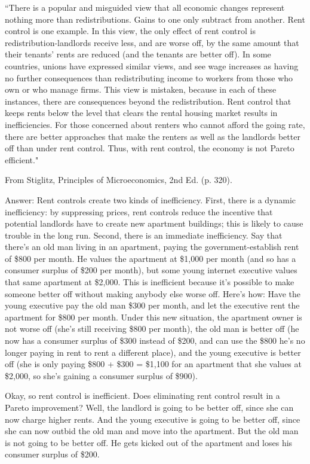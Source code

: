 ``There is a popular and misguided view that all economic changes represent nothing more than redistributions. Gains to one only subtract from another. Rent control is one example. In this view, the only effect of rent control is redistribution-landlords receive less, and are worse off, by the same amount that their tenants' rents are reduced (and the tenants are better off). In some countries, unions have expressed similar views, and see wage increases as having no further consequences than redistributing income to workers from those who own or who manage firms. This view is mistaken, because in each of these instances, there are consequences beyond the redistribution. Rent control that keeps rents below the level that clears the rental housing market results in inefficiencies. For those concerned about renters who cannot afford the going rate, there are better approaches that make the renters as well as the landlords better off than under rent control. Thus, with rent control, the economy is not Pareto efficient."

From Stiglitz, Principles of Microeconomics, 2nd Ed. (p. 320).


Answer: Rent controls create two kinds of inefficiency. First, there is a dynamic inefficiency: by suppressing prices, rent controls reduce the incentive that potential landlords have to create new apartment buildings; this is likely to cause trouble in the long run. Second, there is an immediate inefficiency. Say that there's an old man living in an apartment, paying the government-establish rent of \$800 per month. He values the apartment at \$1,000 per month (and so has a consumer surplus of \$200 per month), but some young internet executive values that same apartment at \$2,000. This is inefficient because it's possible to make someone better off without making anybody else worse off. Here's how: Have the young executive pay the old man \$300 per month, and let the executive rent the apartment for \$800 per month. Under this new situation, the apartment owner is not worse off (she's still receiving \$800 per month), the old man is better off (he now has a consumer surplus of \$300 instead of \$200, and can use the \$800 he's no longer paying in rent to rent a different place), and the young executive is better off (she is only paying \$800 + \$300 = \$1,100 for an apartment that she values at \$2,000, so she's gaining a consumer surplus of \$900). 

Okay, so rent control is inefficient. Does eliminating rent control result in a Pareto improvement? Well, the landlord is going to be better off, since she can now charge higher rents. And the young executive is going to be better off, since she can now outbid the old man and move into the apartment. But the old man is not going to be better off. He gets kicked out of the apartment and loses his consumer surplus of \$200.

